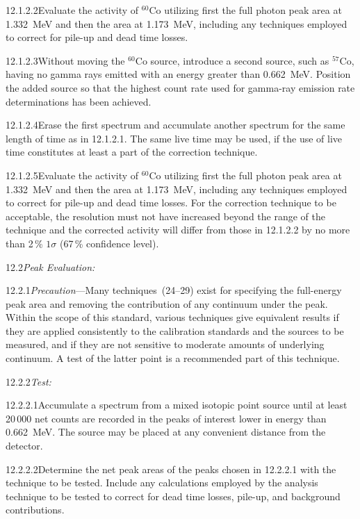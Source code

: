 \documentclass[12pt]{article}
\begin{document}
12.1.2.2\quad Evaluate the activity of $^{60}$Co utilizing first the full photon peak
area at 1.332~MeV and then the area at 1.173~MeV, including any techniques employed to
correct for pile-up and dead time losses.

12.1.2.3\quad Without moving the $^{60}$Co source, introduce a second source, such as
$^{57}$Co, having no gamma rays emitted with an energy greater than 0.662~MeV. Position
the added source so that the highest count rate used for gamma-ray emission rate
determinations has been achieved.

12.1.2.4\quad Erase the first spectrum and accumulate another spectrum for the same
length of time as in 12.1.2.1. The same live time may be used, if the use of live time
constitutes at least a part of the correction technique.

12.1.2.5\quad Evaluate the activity of $^{60}$Co utilizing first the full photon peak
area at 1.332~MeV and then the area at 1.173~MeV, including any techniques employed to
correct for pile-up and dead time losses. For the correction technique to be acceptable,
the resolution must not have increased beyond the range of the technique and the
corrected activity will differ from those in 12.1.2.2 by no more than 2\,\% $1\sigma$
(67\,\% confidence level).

12.2\quad \textit{Peak Evaluation:}

12.2.1\quad \textit{Precaution}---Many techniques~(24--29) exist for specifying the
full-energy peak area and removing the contribution of any continuum under the peak.
Within the scope of this standard, various techniques give equivalent results if they are
applied consistently to the calibration standards and the sources to be measured, and if
they are not sensitive to moderate amounts of underlying continuum. A test of the latter
point is a recommended part of this technique.

12.2.2\quad \textit{Test:}

12.2.2.1\quad Accumulate a spectrum from a mixed isotopic point source until at least
20\,000 net counts are recorded in the peaks of interest lower in energy than 0.662~MeV.
The source may be placed at any convenient distance from the detector.

12.2.2.2\quad Determine the net peak areas of the peaks chosen in 12.2.2.1 with the
technique to be tested. Include any calculations employed by the analysis technique to be
tested to correct for dead time losses, pile-up, and background contributions.
\end{document}

